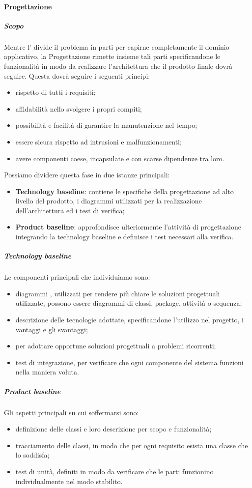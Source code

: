 			\paragraph{Progettazione}
			\subparagraph{Scopo}
			Mentre l' divide il problema in parti per capirne completamente il dominio applicativo, la Progettazione rimette insieme tali parti specificandone le funzionalità in modo da realizzare l'architettura che il prodotto finale dovrà seguire. Questa dovrà seguire i seguenti principi:
			\begin{itemize}
				\item rispetto di tutti i requisiti;
				\item affidabilità nello svolgere i propri compiti;
				\item possibilità e facilità di garantire la manutenzione nel tempo;
				\item essere sicura rispetto ad intrusioni e malfunzionamenti;
				\item avere componenti coese, incapsulate e con scarse dipendenze tra loro.
			\end{itemize}
			Possiamo dividere questa fase in due istanze principali:
			\begin{itemize}
				\item \textbf{Technology baseline}: contiene le specifiche della progettazione ad alto livello del prodotto, i diagrammi  utilizzati per la realizzazione dell'architettura ed i test di verifica;
				\item \textbf{Product baseline}: approfondisce ulteriormente l'attività di progettazione integrando la technology baseline e definisce i test necessari alla verifica.
			\end{itemize}
			\subparagraph{Technology baseline}
			Le componenti principali che individuiamo sono:
			\begin{itemize}
				\item diagrammi , utilizzati per rendere più chiare le soluzioni progettuali utilizzate, possono essere diagrammi di classi, package, attività o sequenza;
				\item descrizione delle tecnologie adottate, specificandone l'utilizzo nel progetto, i vantaggi e gli svantaggi;
				\item {} per adottare opportune soluzioni progettuali a problemi ricorrenti;
				\item test di integrazione, per verificare che ogni componente del sistema funzioni nella maniera voluta.
			\end{itemize}
			\subparagraph{Product baseline}
			Gli aspetti principali su cui soffermarsi sono:
			\begin{itemize}
				\item definizione delle classi e loro descrizione per scopo e funzionalità;
				\item tracciamento delle classi, in modo che per ogni requisito esista una classe che lo soddisfa;
				\item test di unità, definiti in modo da verificare che le parti funzionino individualmente nel modo stabilito.
			\end{itemize}

